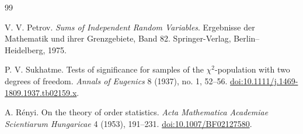 \documentclass[11pt]{article}
\theoremstyle{remark}
\begin{document}

\begin{thebibliography}{99}

V. V. Petrov.
\newblock \emph{Sums of Independent Random Variables}.
\newblock Ergebnisse der Mathematik und ihrer Grenzgebiete, Band 82.
\newblock Springer-Verlag, Berlin--Heidelberg, 1975.

P. V. Sukhatme.
\newblock Tests of significance for samples of the $\chi^2$-population with
two degrees of freedom.
\newblock \emph{Annals of Eugenics} 8 (1937), no. 1, 52--56.
\newblock \href{https://doi.org/10.1111/j.1469-1809.1937.tb02159.x}
{doi:10.1111/j.1469-1809.1937.tb02159.x}.

A. R\'enyi.
\newblock On the theory of order statistics.
\newblock \emph{Acta Mathematica Academiae Scientiarum Hungaricae} 4 (1953),
191--231.
\newblock \href{https://doi.org/10.1007/BF02127580}
{doi:10.1007/BF02127580}.

\end{thebibliography}
\end{document}

